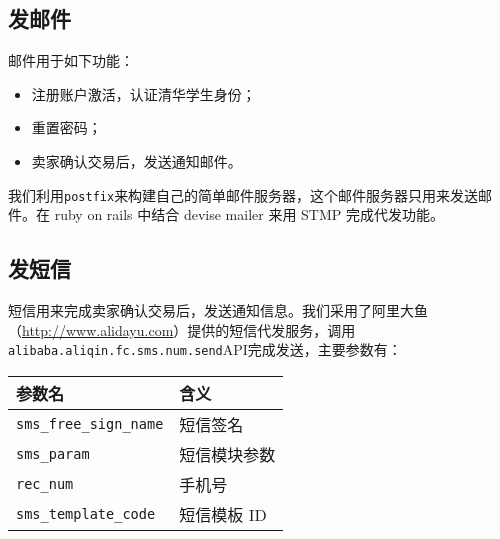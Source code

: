 \subsection{发邮件}

邮件用于如下功能：

\begin{itemize}
    \item 注册账户激活，认证清华学生身份；
    \item 重置密码；
    \item 卖家确认交易后，发送通知邮件。
\end{itemize}

我们利用\texttt{postfix}来构建自己的简单邮件服务器，这个邮件服务器只用来发送邮件。在 ruby on rails 中结合 devise mailer 来用 STMP 完成代发功能。

\subsection{发短信}

短信用来完成卖家确认交易后，发送通知信息。我们采用了阿里大鱼（\url{http://www.alidayu.com}）提供的短信代发服务，调用\texttt{alibaba.aliqin.fc.sms.num.send}API完成发送，主要参数有：

\begin{center}
    \begin{tabular}{ll}
        \toprule
            参数名 & 含义 \\
        \midrule
            \texttt{sms\_free\_sign\_name} & 短信签名 \\
            \texttt{sms\_param} & 短信模块参数 \\
            \texttt{rec\_num} & 手机号 \\
            \texttt{sms\_template\_code} & 短信模板 ID \\
        \bottomrule
    \end{tabular}
\end{center}
